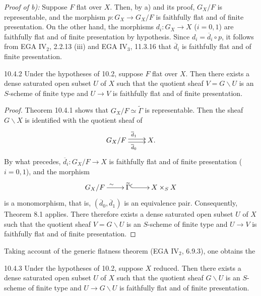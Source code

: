 \emph{Proof of b):} Suppose $F$ flat over $X$. Then, by a) and its proof, $G_X/F$ is representable, and the morphism $p:G_X\to G_X/F$ is faithfully flat and of finite presentation. On the other hand, the morphisms $d_i:G_X\to X$ ($i=0,1$) are faithfully flat and of finite presentation by hypothesis. Since $d_i=\overline d_i\circ p$, it follows from EGA IV$_2$, 2.2.13 (iii) and EGA IV$_3$, 11.3.16 that $\overline d_i$ is faithfully flat and of finite presentation.
\begin{theorem}{10.4.2}\label{V.10.4.2}
Under the hypotheses of 10.2, suppose $F$ flat over $X$. Then there exists a dense saturated open subset $U$ of $X$ such that the quotient \fppf sheaf $V=G\backslash U$ is an $S$-scheme of finite type and $U\to V$ is faithfully flat and of finite presentation.
\end{theorem}
\begin{proof}
Theorem 10.4.1 shows that $G_X/F\simeq\widetilde\Gamma$ is representable. Then the \fppf sheaf $G\backslash X$ is identified with the quotient sheaf of
\[
\xymatrix{G_X/F\ar@<.5ex>[r]^{\overline d_1}\ar@<-.5ex>[r]_{\overline d_0}&X.}
\]
By what precedes, $\overline d_i:G_X/F\to X$ is faithfully flat and of finite presentation ($i=0,1$), and the morphism
\[
\xymatrix{G_X/F\ar[r]^\sim&\widetilde\Gamma\ar@{^{(}->}[r]&X\times_SX}
\]
is a monomorphism, that is, $(\overline d_0,\overline d_1)$ is an equivalence pair. Consequently, Theorem 8.1 applies. There therefore exists a dense saturated open subset $U$ of $X$ such that the quotient \fppf sheaf $V=G\backslash U$ is an $S$-scheme of finite type and $U\to V$ is faithfully flat and of finite presentation.
\end{proof}
Taking account of the generic flatness theorem (EGA IV$_2$, 6.9.3), one obtains the
\begin{corollary}{10.4.3}\label{V.10.4.3}
Under the hypotheses of 10.2, suppose $X$ reduced. Then there exists a dense saturated open subset $U$ of $X$ such that the quotient \fppf sheaf $G\backslash U$ is an $S$-scheme of finite type and $U\to G\backslash U$ is faithfully flat and of finite presentation.
\end{corollary}

